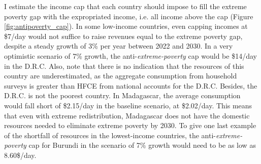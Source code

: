 I estimate the income cap that each country should impose to fill the extreme poverty gap with the expropriated income, i.e. all income above the cap (Figure \ref{fig:antipoverty_cap}). 
In some low-income countries, even capping incomes at \$7/day would not suffice to raise revenues equal to the extreme poverty gap, despite a steady growth of 3\% per year between 2022 and 2030. 
In a very optimistic scenario of 7\% growth, the anti-\textit{extreme-poverty} cap would be \$14/day in the D.R.C. Also, note that there is no indication that the resources of this country are underestimated, as the aggregate consumption from household surveys is greater than HFCE %
from national accounts for the D.R.C. 
Besides, the D.R.C. is not the poorest country. 
In Madagascar, the average consumption would fall short of \$2.15/day in the baseline scenario, at \$2.02/day. This means that even with extreme redistribution, Madagascar does not have the domestic resources needed to eliminate extreme poverty by 2030. 
To give one last example of the shortfall of resources in the lowest-income countries, the anti-\textit{extreme-poverty} cap for Burundi in the scenario of 7\% growth would need to be as low as 8.60\$/day. 

